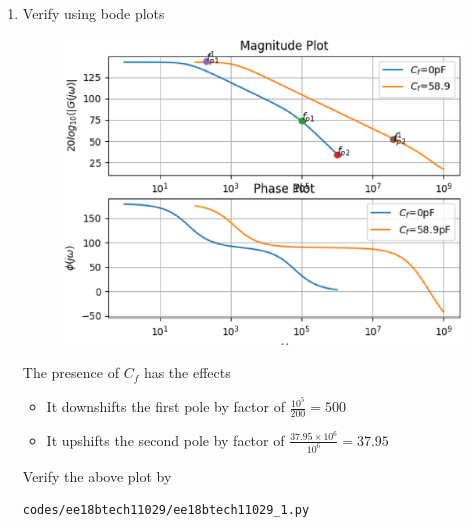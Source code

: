 \begin{enumerate}[label=\thesubsection.\arabic*.,ref=\thesubsection.\theenumi]
\item Verify using bode plots\\
\solution
\begin{figure}[!h]
\centering
\includegraphics[width=\columnwidth]{./figs/ee18btech11029/feedback.eps}
\caption{}
\label{fig:ee18btech11029_1}
\end{figure}
The presence of $C_{f}$ has the effects

\begin{itemize}
    \item It downshifts the first pole by factor of $\frac{10^{5}}{200}=500$
    \item It upshifts the second pole by factor of $\frac{37.95\times10^{6}}{10^{6}}=37.95$
\end{itemize}
Verify the above plot by
\begin{lstlisting}
codes/ee18btech11029/ee18btech11029_1.py
\end{lstlisting}


\end{enumerate}
